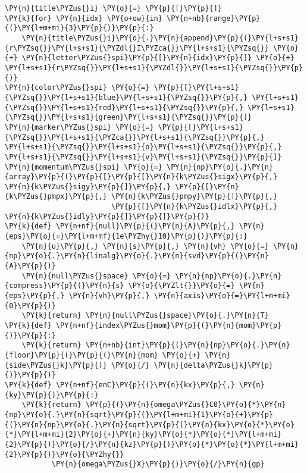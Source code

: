 \begin{Verbatim}[commandchars=\\\{\}]
\PY{n}{title\PYZus{}i} \PY{o}{=} \PY{p}{[}\PY{p}{]}
\PY{k}{for} \PY{n}{idx} \PY{o+ow}{in} \PY{n+nb}{range}\PY{p}{(}\PY{l+m+mi}{3}\PY{p}{)}\PY{p}{:}
    \PY{n}{title\PYZus{}i}\PY{o}{.}\PY{n}{append}\PY{p}{(}\PY{l+s+s1}{r\PYZsq{}}\PY{l+s+s1}{\PYZdl{}I\PYZca{}}\PY{l+s+s1}{\PYZsq{}} \PY{o}{+} \PY{n}{letter\PYZus{}spi}\PY{p}{[}\PY{n}{idx}\PY{p}{]} \PY{o}{+} \PY{l+s+s1}{r\PYZsq{}}\PY{l+s+s1}{\PYZdl{}}\PY{l+s+s1}{\PYZsq{}}\PY{p}{)}
\PY{n}{color\PYZus{}spi} \PY{o}{=} \PY{p}{[}\PY{l+s+s1}{\PYZsq{}}\PY{l+s+s1}{blue}\PY{l+s+s1}{\PYZsq{}}\PY{p}{,} \PY{l+s+s1}{\PYZsq{}}\PY{l+s+s1}{red}\PY{l+s+s1}{\PYZsq{}}\PY{p}{,} \PY{l+s+s1}{\PYZsq{}}\PY{l+s+s1}{green}\PY{l+s+s1}{\PYZsq{}}\PY{p}{]}
\PY{n}{marker\PYZus{}spi} \PY{o}{=} \PY{p}{[}\PY{l+s+s1}{\PYZsq{}}\PY{l+s+s1}{\PYZca{}}\PY{l+s+s1}{\PYZsq{}}\PY{p}{,} \PY{l+s+s1}{\PYZsq{}}\PY{l+s+s1}{o}\PY{l+s+s1}{\PYZsq{}}\PY{p}{,} \PY{l+s+s1}{\PYZsq{}}\PY{l+s+s1}{v}\PY{l+s+s1}{\PYZsq{}}\PY{p}{]}
\PY{n}{momentum\PYZus{}spi} \PY{o}{=} \PY{n}{np}\PY{o}{.}\PY{n}{array}\PY{p}{(}\PY{p}{[}\PY{p}{[}\PY{n}{k\PYZus{}sigx}\PY{p}{,} \PY{n}{k\PYZus{}sigy}\PY{p}{]}\PY{p}{,} \PY{p}{[}\PY{n}{k\PYZus{}pmpx}\PY{p}{,} \PY{n}{k\PYZus{}pmpy}\PY{p}{]}\PY{p}{,}
                         \PY{p}{[}\PY{n}{k\PYZus{}idlx}\PY{p}{,} \PY{n}{k\PYZus{}idly}\PY{p}{]}\PY{p}{]}\PY{p}{)}
\PY{k}{def} \PY{n+nf}{null}\PY{p}{(}\PY{n}{A}\PY{p}{,} \PY{n}{eps}\PY{o}{=}\PY{l+m+mf}{1e\PYZhy{}10}\PY{p}{)}\PY{p}{:}
    \PY{n}{u}\PY{p}{,} \PY{n}{s}\PY{p}{,} \PY{n}{vh} \PY{o}{=} \PY{n}{np}\PY{o}{.}\PY{n}{linalg}\PY{o}{.}\PY{n}{svd}\PY{p}{(}\PY{n}{A}\PY{p}{)}
    \PY{n}{null\PYZus{}space} \PY{o}{=} \PY{n}{np}\PY{o}{.}\PY{n}{compress}\PY{p}{(}\PY{n}{s} \PY{o}{\PYZlt{}}\PY{o}{=} \PY{n}{eps}\PY{p}{,} \PY{n}{vh}\PY{p}{,} \PY{n}{axis}\PY{o}{=}\PY{l+m+mi}{0}\PY{p}{)}
    \PY{k}{return} \PY{n}{null\PYZus{}space}\PY{o}{.}\PY{n}{T}
\PY{k}{def} \PY{n+nf}{index\PYZus{}mom}\PY{p}{(}\PY{n}{mom}\PY{p}{)}\PY{p}{:}
    \PY{k}{return} \PY{n+nb}{int}\PY{p}{(}\PY{n}{np}\PY{o}{.}\PY{n}{floor}\PY{p}{(}\PY{p}{(}\PY{n}{mom} \PY{o}{+} \PY{n}{side\PYZus{}k}\PY{p}{)} \PY{o}{/} \PY{n}{delta\PYZus{}k}\PY{p}{)}\PY{p}{)}
\PY{k}{def} \PY{n+nf}{enC}\PY{p}{(}\PY{n}{kx}\PY{p}{,} \PY{n}{ky}\PY{p}{)}\PY{p}{:}
    \PY{k}{return} \PY{p}{(}\PY{n}{omega\PYZus{}C0}\PY{o}{*}\PY{n}{np}\PY{o}{.}\PY{n}{sqrt}\PY{p}{(}\PY{l+m+mi}{1}\PY{o}{+}\PY{p}{(}\PY{n}{np}\PY{o}{.}\PY{n}{sqrt}\PY{p}{(}\PY{n}{kx}\PY{o}{*}\PY{o}{*}\PY{l+m+mi}{2}\PY{o}{+}\PY{n}{ky}\PY{o}{*}\PY{o}{*}\PY{l+m+mi}{2}\PY{p}{)}\PY{o}{/}\PY{n}{kz}\PY{p}{)}\PY{o}{*}\PY{o}{*}\PY{l+m+mi}{2}\PY{p}{)}\PY{o}{\PYZhy{}}
           \PY{n}{omega\PYZus{}X}\PY{p}{)}\PY{o}{/}\PY{n}{gp}

\end{Verbatim}
